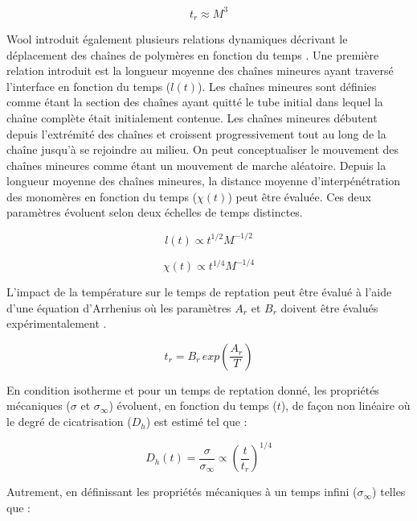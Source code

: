 \begin{equation}
t_r \approx M^3
\end{equation}

Wool introduit également plusieurs relations dynamiques décrivant le déplacement des chaînes de polymères en fonction du temps \cite{Wool1983,Wool1989}. 
Une première relation introduit est la longueur moyenne des chaînes mineures ayant traversé l'interface en fonction du temps ($l(t)$). 
Les chaînes mineures sont définies comme étant la section des chaînes ayant quitté le tube initial dans lequel la chaîne complète était initialement contenue. 
Les chaînes mineures débutent depuis l'extrémité des chaînes et croissent progressivement tout au long de la chaîne jusqu'à se rejoindre au milieu. 
On peut conceptualiser le mouvement des chaînes mineures comme étant un mouvement de marche aléatoire. 
Depuis la longueur moyenne des chaînes mineures, la distance moyenne d'interpénétration des monomères en fonction du temps ($\chi(t)$) peut être évaluée. 
Ces deux paramètres évoluent selon deux échelles de temps distinctes. 

\begin{equation}
l(t) \propto t^{1/2} M^{-1/2}
\end{equation}

\begin{equation}
\chi(t) \propto t^{1/4} M^{-1/4}
\end{equation}

L'impact de la température sur le temps de reptation peut être évalué à l'aide d'une équation d'Arrhenius où les paramètres $A_r$ et $B_r$  doivent être évalués expérimentalement \cite{Bastien1991,Ageorges1998}. 

\begin{equation}
t_r = B_r \, exp \left( \frac{A_r}{T} \right)
\end{equation}

En condition isotherme et pour un temps de reptation donné, les propriétés mécaniques ($\sigma$ et $\sigma_{\infty}$) évoluent, en fonction du temps ($t$), de façon non linéaire où le degré de cicatrisation ($D_{h}$) est estimé tel que \cite{F.Yang2002} : 

\begin{equation}
D_h \left( t \right) = \frac{\sigma}{\sigma_{\infty}} \propto \left( \frac{t}{t_r} \right)^{1/4}
\end{equation}

Autrement, en définissant les propriétés mécaniques à un temps infini ($\sigma_{\infty}$) telles que \cite{Wool1983} :

